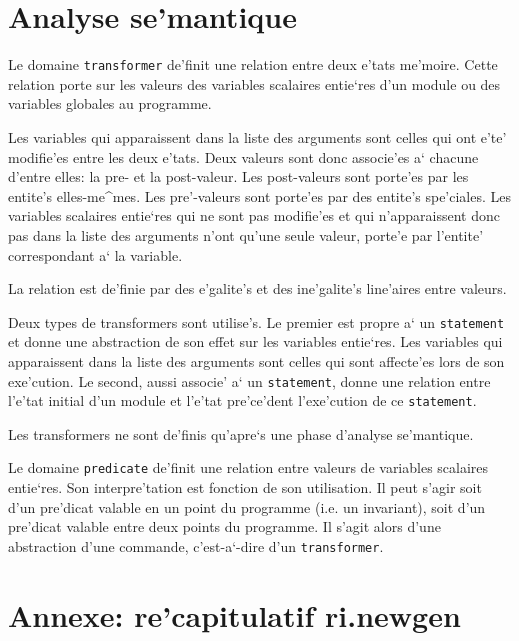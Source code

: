 \section{Analyse se'mantique}
\label{semantics}

{
Le domaine {\tt transformer} de'finit une relation entre deux e'tats
me'moire. Cette relation
porte sur les valeurs des variables scalaires entie`res d'un module ou
des variables globales au programme.

Les variables qui apparaissent dans la liste des arguments sont celles
qui ont e'te' modifie'es entre les deux e'tats. Deux valeurs
sont donc associe'es a` chacune d'entre elles: la pre- et la
post-valeur.  Les post-valeurs sont porte'es par les entite's
elles-me^mes. Les pre'-valeurs sont porte'es par des entite's
spe'ciales. Les variables scalaires entie`res qui ne sont pas modifie'es
et qui n'apparaissent donc pas dans la liste des arguments n'ont qu'une
seule valeur, porte'e par l'entite' correspondant a` la variable.

La relation est de'finie par des e'galite's et des ine'galite's
line'aires entre valeurs.

Deux types de transformers sont utilise's. Le premier est propre a` un
{\tt statement} et donne une abstraction de son effet sur les variables
entie`res. Les variables qui apparaissent dans la liste des arguments
sont celles qui sont affecte'es lors de son exe'cution.  Le second,
aussi associe' a` un {\tt statement}, donne une relation entre l'e'tat
initial d'un module et l'e'tat pre'ce'dent l'exe'cution de ce {\tt statement}.

Les transformers ne sont de'finis qu'apre`s une phase d'analyse se'mantique.
}

{
Le domaine {\tt predicate} de'finit une relation entre valeurs de
variables scalaires entie`res. Son interpre'tation est fonction de
son utilisation. Il peut s'agir soit d'un pre'dicat valable en
un point du programme (i.e. un invariant), soit d'un pre'dicat
valable entre deux points du programme. Il s'agit alors d'une
abstraction d'une commande, c'est-a`-dire d'un {\tt transformer}.
}

\newpage

\section*{Annexe: re'capitulatif ri.newgen}

